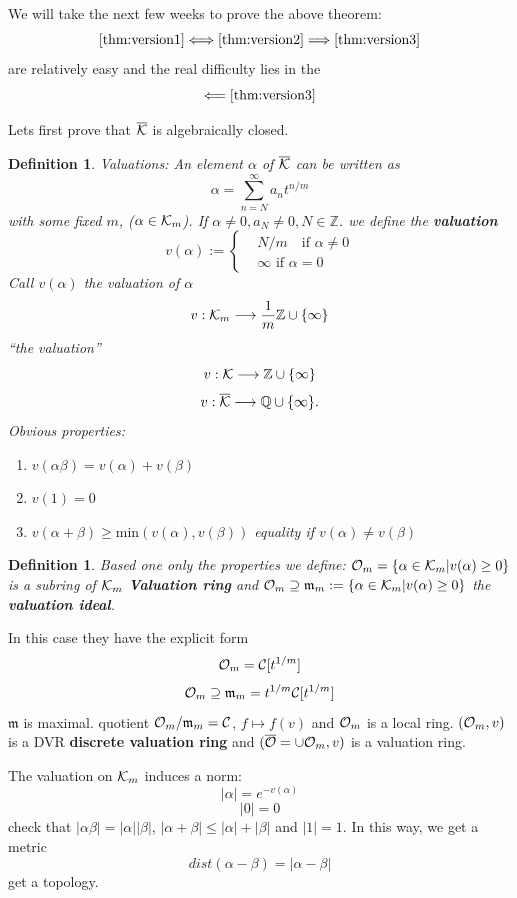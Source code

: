 \documentclass[11pt]{article}
\newtheorem{dfn}[thm]{Definition}
\newcommand{\intg}{\mathbb Z}
\newcommand{\ratl}{\mathbb Q}
\newcommand{\scm}{{\mathfrak m}}
\newcommand{\calc}{{\cal C}}
\newcommand{\calk}{{\cal K}}
\newcommand{\calo}{{\cal O}}
\newcommand{\Lrta}{\Longrightarrow}
\newcommand{\lrta}{\longrightarrow}
\newcommand{\Llta}{\Longleftarrow}
\begin{document}
We will take the next few weeks to prove the above theorem:
$$
\ref{thm:version1}\Longleftrightarrow\ref{thm:version2}\Lrta\ref{thm:version3}
$$
are relatively easy and the real difficulty lies in the 
$$
\Llta\ref{thm:version3}
$$

Lets first prove that $\overline{\calk}$ is algebraically closed.

\begin{dfn}
Valuations: An element $\alpha$ of $\overline{\calk}$ can be written as 
$$
\alpha =\sum_{n=N}^\infty a_n t^{n/m}
$$
with some fixed $m$, ($\alpha\in \calk_m$). If $\alpha\neq 0, a_N\neq 0 ,N\in\intg$. we define the \textbf{valuation}
$$
v(\alpha):=\left\{
\begin{aligned}
& N/m \ \ \  \text{ if $\alpha\neq 0$}\\
& \infty \text{     \ \ \ \ \ \      if $\alpha=0$}
\end{aligned}
\right.
$$
Call $v(\alpha)$ the valuation of $\alpha$
$$
v:\calk_m\lrta \frac{1}{m}\intg\cup \{\infty\}
$$
``the valuation''
$$
v:\calk\lrta \intg\cup\{\infty\}
$$
$$
v:\overline{\calk}\lrta \ratl\cup \{\infty\}.
$$
Obvious properties:
\begin{enumerate}[label=(\roman*)]
\item $v(\alpha\beta)=v(\alpha)+v(\beta)$
\item $v(1)=0$
\item $v(\alpha+\beta)\geq \text{min}(v(\alpha),v(\beta))$ equality if $v(\alpha)\neq v(\beta)$
\end{enumerate}
\end{dfn}
\begin{dfn}
Based one only the properties we define:
$\calo_m=\{\alpha\in\calk_m|v(\alpha)\geq 0\}$ is a subring of $\calk_m$ \textbf{Valuation ring} and 
$\calo_m\supseteq \scm_m:=\{\alpha\in \calk_m|v(\alpha)\geq 0\}$ the \textbf{valuation ideal}.
\end{dfn}
In this case they have the explicit form
$$
\calo_m=\calc[t^{1/m}]
$$
$$
\calo_m\supseteq \scm_m =t^{1/m}\calc[t^{1/m}]
$$
$\scm$ is maximal. quotient $\calo_m/\scm_m=\calc$, $f\longmapsto f(v)$ and $\calo_m$ is a local ring. $(\calo_m,v)$ is a DVR \textbf{discrete valuation ring } and $(\overline{\calo}=\cup\calo_m,v)$ is a valuation ring.

The valuation on $\calk_m$ induces a norm:
$$
|\alpha|=e^{-v(\alpha)}
$$
$$
|0|=0
$$
check that 
$|\alpha\beta|=|\alpha||\beta|$, $|\alpha+\beta|\leq |\alpha|+|\beta|$ and $|1|=1$. In this way, we get a metric
$$
dist(\alpha-\beta)=|\alpha-\beta|
$$
get a topology.
\end{document}
